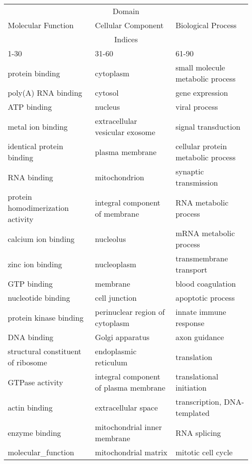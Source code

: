 \begin{table}
    \centering
    \tiny
    \begin{tabular}{p{} p{} p{}}
        \multicolumn{3}{c}{Domain} \\
        Molecular Function & Cellular Component & Biological Process \\
        \hline
        \multicolumn{3}{c}{Indices} \\
        1-30        & 31-60     & 61-90 \\
        \hline
        protein binding & cytoplasm & small molecule metabolic process \\
        poly(A) RNA binding & cytosol & gene expression \\
        ATP binding & nucleus & viral process \\
        metal ion binding & extracellular vesicular exosome & signal transduction \\
        identical protein binding & plasma membrane & cellular protein metabolic process \\
        RNA binding & mitochondrion & synaptic transmission \\
        protein homodimerization activity & integral component of membrane & RNA metabolic process \\
        calcium ion binding & nucleolus & mRNA metabolic process \\
        zinc ion binding & nucleoplasm & transmembrane transport \\
        GTP binding & membrane & blood coagulation \\
        nucleotide binding & cell junction & apoptotic process \\
        protein kinase binding & perinuclear region of cytoplasm & innate immune response \\
        DNA binding & Golgi apparatus & axon guidance \\
        structural constituent of ribosome & endoplasmic reticulum & translation \\
        GTPase activity & integral component of plasma membrane & translational initiation \\
        actin binding & extracellular space & transcription, DNA-templated \\
        enzyme binding & mitochondrial inner membrane & RNA splicing \\
        molecular_function & mitochondrial matrix & mitotic cell cycle \\

\end{tabular}
\end{table}
